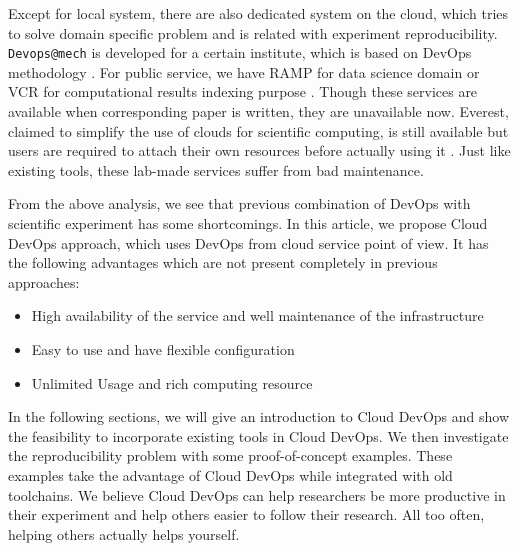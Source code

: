 \documentclass[10pt, conference, compsocconf]{IEEEtran}
\begin{document}
Except for local system, there are also dedicated system on the cloud, which tries to solve domain specific problem and is related with experiment reproducibility. \texttt{Devops@mech} is developed for a certain institute, which is based on DevOps methodology \cite{philips2019devops}. For public service, we have    RAMP for data science domain \cite{kegl2018ramp} or VCR for computational results indexing purpose \cite{GavishD12}. Though these services are available when corresponding paper is written, they are unavailable now.
Everest, claimed to simplify the use of clouds for scientific computing, is still available but users are required to attach their own resources before actually using it \cite{VOLKOV2017112}.
Just like existing tools, these lab-made services suffer from bad maintenance.

From the above analysis, we see that previous combination of DevOps with scientific experiment has some shortcomings. In this article, we propose Cloud DevOps approach, which uses DevOps from cloud service point of view. It has the following advantages which are not present completely in previous approaches:
\begin{itemize}
	\item High availability of the service and well maintenance of the infrastructure
	\item Easy to use and have flexible configuration
	\item Unlimited Usage and rich computing resource
\end{itemize}
 In the following sections, we will give an introduction to Cloud DevOps and show the feasibility to incorporate existing tools in Cloud DevOps. We then investigate the reproducibility problem with some proof-of-concept examples. These examples take the advantage of Cloud DevOps while integrated with old toolchains. We believe Cloud DevOps can help researchers be more productive in their experiment and help others easier to follow their research. All too often, helping others actually helps yourself.
\end{document}
